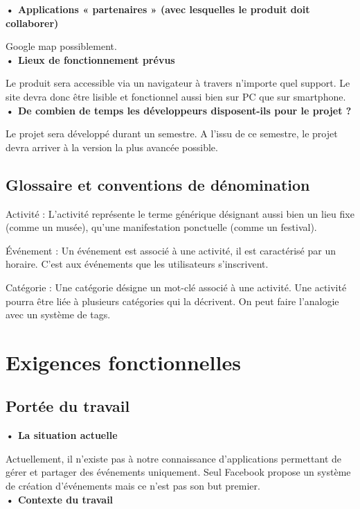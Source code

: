 \documentclass[a4paper,12pt]{article}
\begin{document}
\textbf{• Applications « partenaires » (avec lesquelles le produit doit collaborer)}

Google map possiblement. \\

\textbf{• Lieux de fonctionnement prévus}

Le produit sera accessible via un navigateur à travers n’importe quel support. Le site devra donc être lisible et fonctionnel aussi bien sur PC que sur smartphone. \\

\textbf{• De combien de temps les développeurs disposent-ils pour le projet ?}

Le projet sera développé durant un semestre. A l’issu de ce semestre, le projet devra arriver à la version la plus avancée possible.

\subsection{Glossaire et conventions de dénomination}

Activité : L’activité représente le terme générique désignant aussi bien un lieu fixe (comme un musée), qu’une manifestation ponctuelle (comme un festival).

Événement : Un événement est associé à une activité, il est caractérisé par un horaire. C’est aux événements que les utilisateurs s’inscrivent.

Catégorie : Une catégorie désigne un mot-clé associé à une activité. Une activité pourra être liée à plusieurs catégories qui la décrivent. On peut faire l’analogie avec un système de tags.

\section{Exigences fonctionnelles}

\subsection{Portée du travail}

\textbf{• La situation actuelle}

Actuellement, il n’existe pas à notre connaissance d’applications permettant de gérer et partager des événements uniquement. Seul Facebook propose un système de création d’événements mais ce n’est pas son but premier. \\

\textbf{• Contexte du travail}
\end{document}
